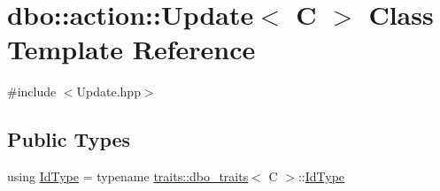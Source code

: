 \hypertarget{classdbo_1_1action_1_1_update}{\section{dbo\+:\+:action\+:\+:Update$<$ C $>$ Class Template Reference}
\label{classdbo_1_1action_1_1_update}
}


{\ttfamily \#include $<$Update.\+hpp$>$}

\subsection*{Public Types}
\begin{DoxyCompactItemize}
\item 
using \hyperlink{classdbo_1_1action_1_1_update_ade7e784c4031bf879160b8934ef4414b}{Id\+Type} = typename \hyperlink{structdbo_1_1traits_1_1dbo__traits}{traits\+::dbo\+\_\+traits}$<$ C $>$\+::\hyperlink{classdbo_1_1action_1_1_update_ade7e784c4031bf879160b8934ef4414b}{Id\+Type}
\end{DoxyCompactItemize}
